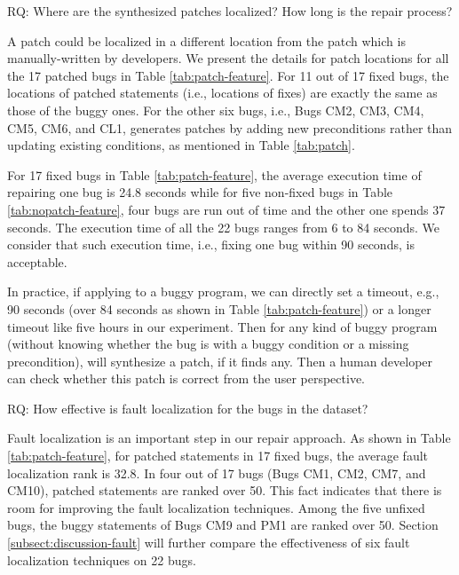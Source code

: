 \medskip
\begin{mdframed}
RQ: Where are the synthesized patches localized? How long is the repair process? 
\end{mdframed}

A patch could be localized in a different location from the patch which is manually-written by developers. We present the details for patch locations for all the 17 patched bugs in Table \ref{tab:patch-feature}. 
For 11 out of 17 fixed bugs, the locations of patched statements (i.e., locations of fixes) are exactly the same as those of the buggy ones. For the other six bugs, i.e., Bugs CM2, CM3, CM4, CM5, CM6, and CL1, \nopol generates patches by adding new preconditions rather than updating existing conditions, as mentioned in Table \ref{tab:patch}. 

For 17 fixed bugs in Table \ref{tab:patch-feature}, the average execution time of repairing one bug is 24.8 seconds while for five non-fixed bugs in Table \ref{tab:nopatch-feature}, four bugs are run out of time and the other one spends 37 seconds. The execution time of all the 22 bugs ranges from 6 to 84 seconds. We consider that such execution time, i.e., fixing one bug within 90 seconds, is acceptable. 

In practice, if applying \nopol to a buggy program, we can directly set a timeout, e.g., 90 seconds (over 84 seconds as shown in Table \ref{tab:patch-feature}) or a longer timeout like five hours in our experiment. Then for any kind of buggy program (without knowing whether the bug is with a buggy condition or a missing precondition), \nopol will synthesize a patch, if it finds any. Then a human developer can check whether this patch is correct from the user perspective. 

\medskip
\begin{mdframed}
RQ:  How effective is fault localization for the bugs in the dataset?
\end{mdframed}

Fault localization is an important step in our repair approach. As shown in Table \ref{tab:patch-feature}, for patched statements in 17 fixed bugs, the average fault localization rank is 32.8. In four out of 17 bugs (Bugs CM1, CM2, CM7, and CM10), patched statements are ranked over 50. This fact indicates that there is room for improving the fault localization techniques. Among the five unfixed bugs, the buggy statements of Bugs CM9 and PM1 are ranked over 50. Section \ref{subsect:discussion-fault} will further compare the effectiveness of six fault localization techniques on 22 bugs. 

